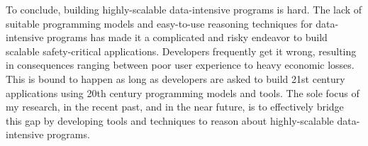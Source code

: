 To conclude, building highly-scalable data-intensive programs is hard.
The lack of suitable programming models and easy-to-use reasoning
techniques for data-intensive programs has made it a complicated and
risky endeavor to build scalable safety-critical applications.
Developers frequently get it wrong, resulting in consequences ranging
between poor user experience to heavy economic losses. This is bound
to happen as long as developers are asked to build 21st century
applications using 20th century programming models and tools. The sole
focus of my research, in the recent past, and in the near future, is
to effectively bridge this gap by developing tools and techniques to
reason about highly-scalable data-intensive programs.

